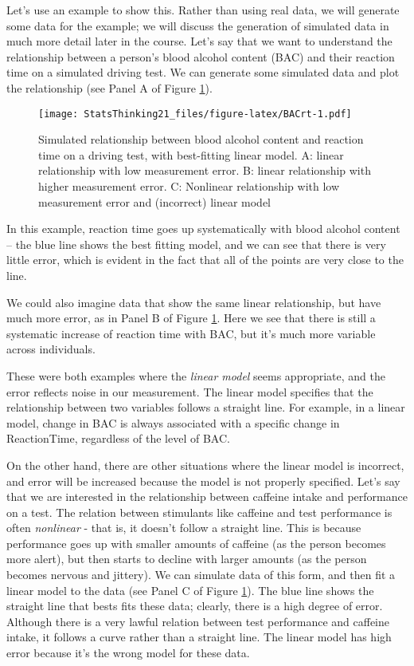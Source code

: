 \documentclass[]{book}
\theoremstyle{definition}
\theoremstyle{definition}
\theoremstyle{definition}
\theoremstyle{remark}
\begin{document}
Let's use an example to show this. Rather than using real data, we will
generate some data for the example; we will discuss the generation of
simulated data in much more detail later in the course. Let's say that
we want to understand the relationship between a person's blood alcohol
content (BAC) and their reaction time on a simulated driving test. We
can generate some simulated data and plot the relationship (see Panel A
of Figure \ref{fig:BACrt}).

\begin{figure}
\centering
\texttt{[image: StatsThinking21\_files/figure-latex/BACrt-1.pdf]}
\caption{\label{fig:BACrt}Simulated relationship between blood alcohol
content and reaction time on a driving test, with best-fitting linear
model. A: linear relationship with low measurement error. B: linear
relationship with higher measurement error. C: Nonlinear relationship
with low measurement error and (incorrect) linear model}
\end{figure}

In this example, reaction time goes up systematically with blood alcohol
content -- the blue line shows the best fitting model, and we can see
that there is very little error, which is evident in the fact that all
of the points are very close to the line.

We could also imagine data that show the same linear relationship, but
have much more error, as in Panel B of Figure \ref{fig:BACrt}. Here we
see that there is still a systematic increase of reaction time with BAC,
but it's much more variable across individuals.

These were both examples where the \emph{linear model} seems
appropriate, and the error reflects noise in our measurement. The linear
model specifies that the relationship between two variables follows a
straight line. For example, in a linear model, change in BAC is always
associated with a specific change in ReactionTime, regardless of the
level of BAC.

On the other hand, there are other situations where the linear model is
incorrect, and error will be increased because the model is not properly
specified. Let's say that we are interested in the relationship between
caffeine intake and performance on a test. The relation between
stimulants like caffeine and test performance is often \emph{nonlinear}
- that is, it doesn't follow a straight line. This is because
performance goes up with smaller amounts of caffeine (as the person
becomes more alert), but then starts to decline with larger amounts (as
the person becomes nervous and jittery). We can simulate data of this
form, and then fit a linear model to the data (see Panel C of Figure
\ref{fig:BACrt}). The blue line shows the straight line that bests fits
these data; clearly, there is a high degree of error. Although there is
a very lawful relation between test performance and caffeine intake, it
follows a curve rather than a straight line. The linear model has high
error because it's the wrong model for these data.
\end{document}
